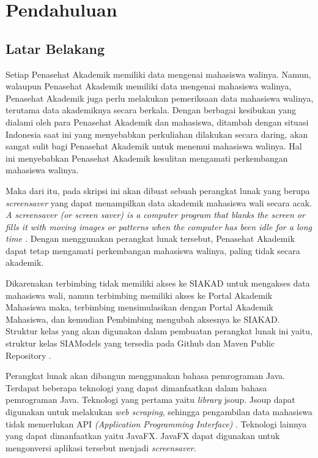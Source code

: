 \chapter{Pendahuluan}
\label{chap:intro}
   
\section{Latar Belakang}
\label{sec:label}

Setiap Penasehat Akademik memiliki data mengenai mahasiswa walinya. Namun, walaupun Penasehat Akademik memiliki data mengenai mahasiswa walinya, Penasehat Akademik juga perlu melakukan pemeriksaan data mahasiswa walinya, terutama data akademiknya secara berkala. Dengan berbagai kesibukan yang dialami oleh para Penasehat Akademik dan mahasiswa, ditambah dengan situasi Indonesia saat ini yang menyebabkan perkuliahan dilakukan secara daring, akan sangat sulit bagi Penasehat Akademik untuk menemui mahasiswa walinya. Hal ini menyebabkan Penasehat Akademik kesulitan mengamati perkembangan mahasiswa walinya. 

Maka dari itu, pada skripsi ini akan dibuat sebuah perangkat lunak yang berupa \textit{screensaver} yang dapat menampilkan data akademik mahasiswa wali secara acak. \textit{A screensaver (or screen saver) is a computer program that blanks the screen or fills it with moving images or patterns when the computer has been idle for a long time \cite{screensaver}.} Dengan menggunakan perangkat lunak tersebut, Penasehat Akademik dapat tetap mengamati perkembangan mahasiswa walinya, paling tidak secara akademik.

Dikarenakan terbimbing tidak memiliki akses ke SIAKAD \cite{siakad} untuk mengakses data mahasiswa wali, namun terbimbing memiliki akses ke Portal Akademik Mahasiswa \cite{stupor} maka, terbimbing mensimulasikan dengan Portal Akademik Mahasiswa, dan kemudian Pembimbing mengubah aksesnya ke SIAKAD. Struktur kelas yang akan digunakan dalam pembuatan perangkat lunak ini yaitu, struktur kelas SIAModels yang tersedia pada Github dan Maven Public Repository \cite{siamodels}.

Perangkat lunak akan dibangun menggunakan bahasa pemrograman Java. Terdapat beberapa teknologi yang dapat dimanfaatkan dalam bahasa pemrograman Java. Teknologi yang pertama yaitu \textit{library} jsoup. Jsoup dapat digunakan untuk melakukan \textit{web scraping}, sehingga pengambilan data mahasiswa tidak memerlukan API \textit{(Application Programming Interface)} \cite{jsoup}. Teknologi lainnya yang dapat dimanfaatkan yaitu JavaFX. JavaFX dapat digunakan untuk mengonversi aplikasi tersebut menjadi \textit{screensaver}.



